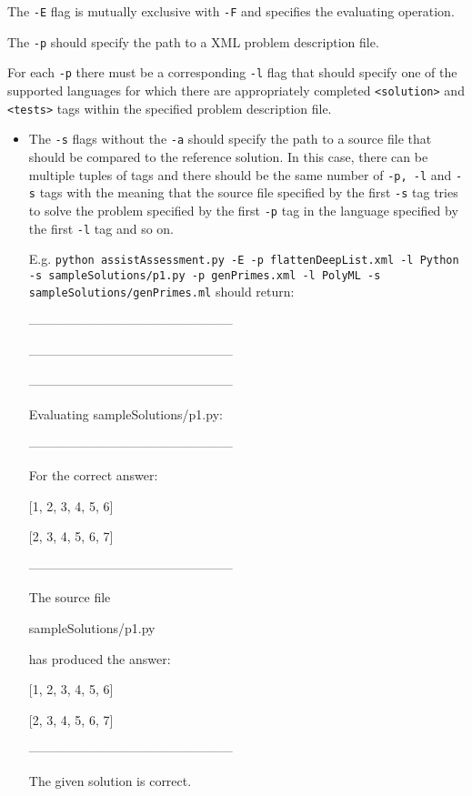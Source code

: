 \documentclass[a4paper,12pt]{article}
\begin{document}
\begin{itemize}
 The \texttt{-E} flag is mutually exclusive with \texttt{-F} and specifies the evaluating operation. 

 The \texttt{-p} should specify the path to a XML problem description file. 

 For each \texttt{-p} there must be a corresponding \texttt{-l} flag that should specify one of the supported languages for which there are appropriately completed \texttt{<solution>} and \texttt{<tests>} tags within the specified problem description file.

 
 \begin{itemize}
  \item 
  
 The \texttt{-s} flags without the \texttt{-a} should specify the path to a source file that should be compared to the reference solution. In this case, there can be multiple tuples of tags and  there should be the same number of \texttt{-p, -l} and \texttt{-s} tags with the meaning that the source file specified by the first \texttt{-s} tag tries to solve the problem specified by the first \texttt{-p} tag in the language specified by the first \texttt{-l} tag and so on.

E.g. \texttt{python assistAssessment.py -E -p flattenDeepList.xml -l Python -s sampleSolutions/p1.py -p genPrimes.xml -l PolyML -s sampleSolutions/genPrimes.ml} should return:

------------------------------------------------

------------------------------------------------

------------------------------------------------

        Evaluating sampleSolutions/p1.py:

------------------------------------------------

For the correct answer:

[1, 2, 3, 4, 5, 6]

[2, 3, 4, 5, 6, 7]

------------------------------------------------

The source file 

        sampleSolutions/p1.py

has produced the answer:

[1, 2, 3, 4, 5, 6]

[2, 3, 4, 5, 6, 7]

------------------------------------------------

The given solution is correct.


\end{itemize}
\end{itemize}
\end{document}
